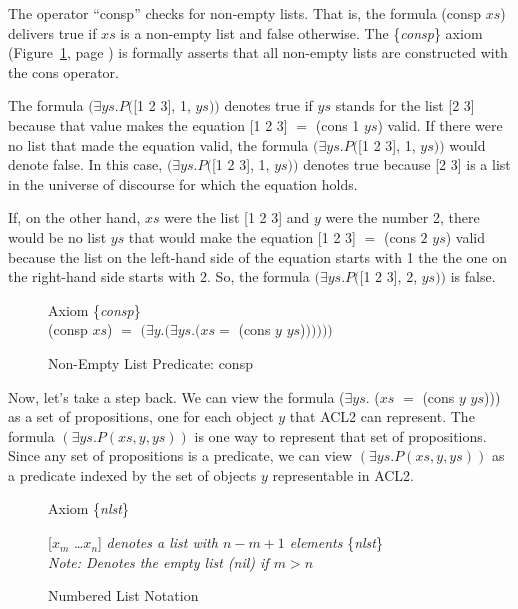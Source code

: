 The operator ``consp'' checks for non-empty lists.
That is, the formula (consp $xs$) delivers true
if $xs$ is a non-empty list and false otherwise.
The \{\emph{consp}\} axiom
(Figure~\ref{consp-axiom}, page \pageref{consp-axiom})
is formally asserts that all non-empty lists
are constructed with the cons operator.

The formula
$(\exists ys.P($[1 2 3], 1, $ys))$ denotes true
if $ys$ stands for the list [2 3] because that value makes
the equation [1 2 3] $=$ (cons 1 $ys$) valid.
If there were no list that made the equation valid,
the formula $(\exists ys.P($[1 2 3], 1, $ys))$
would denote false.
In this case, $(\exists ys.P($[1 2 3], 1, $ys))$ denotes true
because [2 3] is a list in the universe of discourse
for which the equation holds.

If, on the other hand, $xs$ were the list [1 2 3]
and $y$ were the number 2, there would be no list
$ys$ that would make the equation [1 2 3] $=$ (cons $2$ $ys$) valid
because the list on the left-hand side of the equation
starts with 1 the the one on the right-hand side starts with 2.
So, the formula $(\exists ys.P($[1 2 3], 2, $ys))$
is false.

\begin{figure}
\begin{center}
Axiom \{\emph{consp}\} \\
(consp $xs$) $=$  $(\exists y.(\exists ys.(xs =$ (cons $y$ $ys$)$)))))$
\end{center}
\caption{Non-Empty List Predicate: consp}
\label{consp-axiom}
\end{figure}

Now, let's take a step back.
We can view the formula
($\exists ys.$ ($xs$ $=$ (cons $y$ $ys$)))
as a set of propositions,
one for each object $y$ that ACL2 can represent.
The formula
$(\exists ys.P(xs, y, ys))$ is one way to represent that
set of propositions.
Since any set of propositions is a predicate,
we can view $(\exists ys.P(xs, y, ys))$ as a predicate indexed
by the set of objects $y$ representable in ACL2.

\begin{figure}
\begin{center}
Axiom \{\emph{nlst}\}

[$x_{m}$ \dots $x_{n}$]  \emph{denotes a list with $n - m + 1$ elements} \{\emph{nlst}\} \\
\emph{Note: Denotes the empty list (nil) if $m > n$}
\end{center}
\caption{Numbered List Notation}
\label{numbered-list-interpretation}
\end{figure}


